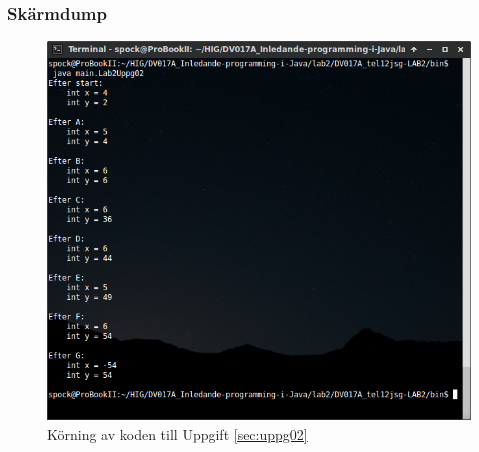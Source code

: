 \subsubsection{Skärmdump}
\begin{figure}[htbp]
    \centering
        \includegraphics[width=\linewidth]{img/02.png}
    \caption{Körning av koden till Uppgift \ref{sec:uppg02}}
    \label{fig:uppg02-screenshot}
\end{figure}

